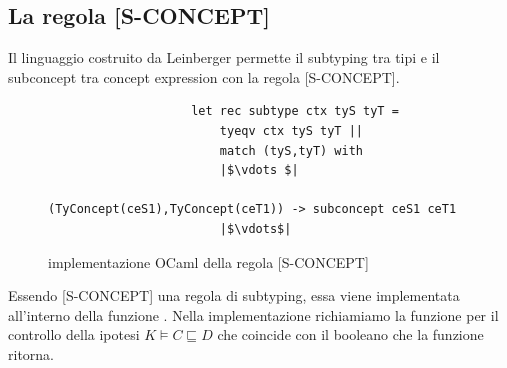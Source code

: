             \subsection{La regola [S-CONCEPT]}
            Il linguaggio costruito da Leinberger permette il subtyping tra tipi e il subconcept tra concept expression con la regola [S-CONCEPT].
            \begin{figure}[h]
                \begin{verbatim}
                    let rec subtype ctx tyS tyT =
                        tyeqv ctx tyS tyT ||
                        match (tyS,tyT) with
                        |$\vdots $|
                            (TyConcept(ceS1),TyConcept(ceT1)) -> subconcept ceS1 ceT1
                        |$\vdots$|
                \end{verbatim}
            \caption{implementazione OCaml della regola [S-CONCEPT]}
            \end{figure}
            Essendo [S-CONCEPT] una regola di subtyping, essa viene implementata all'interno della funzione . Nella implementazione richiamiamo la funzione 
             per il controllo della ipotesi $K \vDash C \sqsubseteq D$ che coincide con il booleano che la funzione ritorna. 












        
        